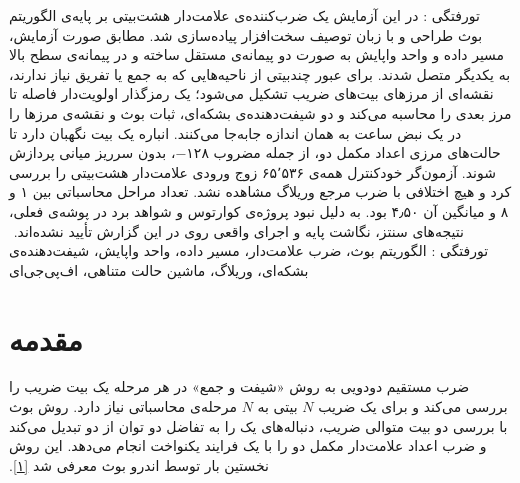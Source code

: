 \newsavebox{\dsdlcodebox}
\newenvironment{dsdlcodeblock}
{%
  \par\noindent
  \begin{latin}
  \begin{lrbox}{\dsdlcodebox}
  \begin{minipage}{1.1\linewidth}
  \small
}
{%
  \end{minipage}
  \end{lrbox}
  \setlength{\fboxsep}{6pt}
  \fcolorbox{dsdlcodeborder}{dsdlcodebg}{\usebox{\dsdlcodebox}}
  \end{latin}
  \par
}

‫%
‫%
‫%
‫
‫‌تورفتگی : در این آزمایش یک ضرب‌کننده‌ی علامت‌دار هشت‌بیتی بر پایه‌ی
‫الگوریتم بوث طراحی و با زبان توصیف سخت‌افزار  پیاده‌سازی شد. مطابق صورت
‫آزمایش، مسیر داده و واحد واپایش به صورت دو پیمانه‌ی مستقل ساخته و در پیمانه‌ی سطح بالا به
‫یکدیگر متصل شدند. برای عبور چندبیتی از ناحیه‌هایی که به جمع یا تفریق نیاز ندارند، نقشه‌ای از
‫مرزهای بیت‌های ضریب تشکیل می‌شود؛ یک رمزگذار اولویت‌دار فاصله تا مرز بعدی را محاسبه می‌کند و
‫دو شیفت‌دهنده‌ی بشکه‌ای، ثبات بوث و نقشه‌ی مرزها را در یک نبض ساعت به همان اندازه جابه‌جا
‫می‌کنند. انباره یک بیت نگهبان دارد تا حالت‌های مرزی اعداد مکمل دو، از جمله مضروب ۱۲۸−، بدون
‫سرریز میانی پردازش شوند. آزمون‌گر خودکنترل همه‌ی ۶۵٬۵۳۶ زوج ورودی علامت‌دار هشت‌بیتی را
‫بررسی کرد و هیچ اختلافی با ضرب مرجع وریلاگ مشاهده نشد. تعداد مراحل محاسباتی بین ۱ و ۸ و
‫میانگین آن ۴٫۵۰ بود. به دلیل نبود پروژه‌ی کوارتوس و شواهد برد در پوشه‌ی فعلی، نتیجه‌های سنتز،
‫نگاشت پایه و اجرای واقعی روی  در این گزارش تأیید نشده‌اند.
‫
‫‌تورفتگی :
‫الگوریتم بوث، ضرب علامت‌دار، مسیر داده، واحد واپایش، شیفت‌دهنده‌ی بشکه‌ای، وریلاگ،
‫ماشین حالت متناهی، اف‌پی‌جی‌ای
‫
‫
‫\section{مقدمه}
‫
‫ضرب مستقیم دودویی به روش «شیفت و جمع» در هر مرحله یک بیت ضریب را بررسی می‌کند و برای
‫یک ضریب $N$ بیتی به $N$ مرحله‌ی محاسباتی نیاز دارد. روش بوث با بررسی دو بیت متوالی ضریب،
‫دنباله‌های یک را به تفاضل دو توان از دو تبدیل می‌کند و ضرب اعداد علامت‌دار مکمل دو را با یک
‫فرایند یکنواخت انجام می‌دهد. این روش نخستین بار توسط اندرو بوث معرفی شد
‫\href{https://doi.org/10.1093/qjmam/4.2.236}{[۱]}.
